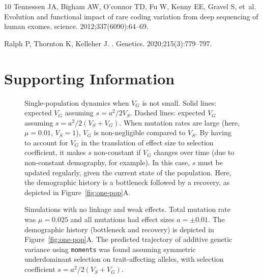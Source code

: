 \documentclass[10pt,letterpaper]{article}
\newcommand{\moments}{\texttt{moments}\xspace}
\begin{document}
\begin{thebibliography}{10}
Tennessen JA, Bigham AW, O’connor TD, Fu W, Kenny EE, Gravel S, et~al.
\newblock Evolution and functional impact of rare coding variation from deep
  sequencing of human exomes.
\newblock science. 2012;337(6090):64--69.

Ralph P, Thornton K, Kelleher J.
.
\newblock Genetics. 2020;215(3):779--797.

\end{thebibliography}

\section*{Supporting Information}

\renewcommand{\thesection}{S\arabic{section}}
\renewcommand{\thetable}{S\arabic{table}}
\renewcommand{\thefigure}{S\arabic{figure}}

\setcounter{figure}{0}

\begin{figure}[ht!]
    \centering
    \caption{
        Single-population dynamics when $V_G$ is not small.
        Solid lines: expected $V_G$ assuming $s=a^2/2V_S$. Dashed lines:
        expected $V_G$ assuming $s=a^2/2(V_S+V_G)$. When mutation rates
        are large (here, $\mu=0.01$, $V_S=1$), $V_G$ is non-negligible
        compared to $V_S$. By having to account for $V_G$ in the
        translation of effect size to selection coefficient, it makes
        $s$ non-constant if $V_G$ changes over time (due to non-constant
        demography, for example). In this case, $s$ must be updated
        regularly, given the current state of the population.
        Here, the demographic history is a bottleneck followed by a
        recovery, as depicted in Figure~\ref{fig:one-pop}A.
    }
    \label{fig:supp-one-pop}
\end{figure}

\begin{figure}[ht!]
    \centering
    \caption{
        Simulations with no linkage and weak effects.
        Total mutation rate was $\mu=0.025$ and all mutations had effect
        sizes $a=\pm 0.01$. The demographic history (bottleneck and
        recovery) is depicted in Figure~\ref{fig:one-pop}A. The predicted
        trajectory of additive genetic variance using \moments was found
        assuming symmetric underdominant selection on trait-affecting
        alleles, with selection coefficient $s=a^2/2(V_S+V_G)$.
    }
    \label{fig:one-pop-0.01}
\end{figure}
\end{document}
